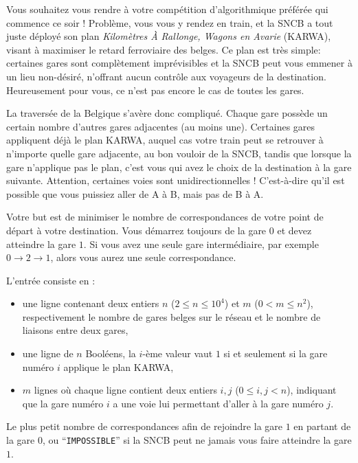\problemname{\problemyamlname}


Vous souhaitez vous rendre à votre compétition d'algorithmique préférée qui commence ce soir ! Problème, vous vous y rendez en train, et la SNCB a tout juste déployé son plan \emph{Kilomètres À Rallonge, Wagons en Avarie} (KARWA), visant à maximiser le retard ferroviaire des belges. Ce plan est très simple: certaines gares sont complètement imprévisibles et la SNCB peut vous emmener à un lieu non-désiré, n'offrant aucun contrôle aux voyageurs de la destination. Heureusement pour vous, ce n'est pas encore le cas de toutes les gares.

La traversée de la Belgique s'avère donc compliqué. Chaque gare possède un certain nombre d'autres gares adjacentes (au moins une). Certaines gares appliquent déjà le plan KARWA, auquel cas votre train peut se retrouver à n'importe quelle gare adjacente, au bon vouloir de la SNCB, tandis que lorsque la gare n'applique pas le plan, c'est vous qui avez le choix de la destination à la gare suivante. Attention, certaines voies sont unidirectionnelles ! C'est-à-dire qu'il est possible que vous puissiez aller de A à B, mais pas de B à A.

Votre but est de minimiser le nombre de correspondances de votre point de départ à votre destination. Vous démarrez toujours de la gare $0$ et devez atteindre la gare $1$. Si vous avez une seule gare intermédiaire, par exemple $0 \rightarrow 2 \rightarrow 1$, alors vous aurez une seule correspondance.

\begin{Input}
	L'entrée consiste en :
	\begin{itemize}
		\item une ligne contenant deux entiers $n$ ($2 \le n \le 10^4$) et $m$ ($0 < m \le n^2$), respectivement le nombre de gares belges sur le réseau et le nombre de liaisons entre deux gares,
		\item une ligne de $n$ Booléens, la $i$-ème valeur vaut $1$ si et seulement si la gare numéro $i$ applique le plan KARWA,
		\item $m$ lignes où chaque ligne contient deux entiers $i, j$ ($0 \leq i,j < n$), indiquant que la gare numéro $i$ a une voie lui permettant d'aller à la gare numéro $j$.
	\end{itemize}
\end{Input}

\begin{Output}
	Le plus petit nombre de correspondances afin de rejoindre la gare $1$ en partant de la gare $0$, ou ``\texttt{IMPOSSIBLE}'' si la SNCB peut ne jamais vous faire atteindre la gare $1$.
\end{Output}

